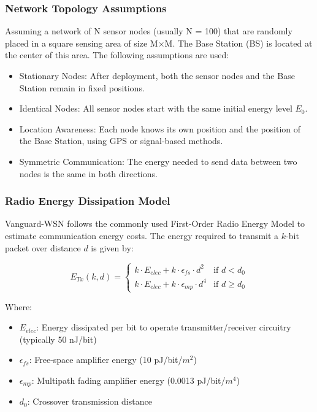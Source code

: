 \documentclass[conference]{IEEEtran}
\begin{document}
\subsubsection{Network Topology Assumptions}
Assuming a network of N sensor nodes (usually N = 100) that are randomly placed in a square sensing area of size M$\times$M. The Base Station (BS) is located at the center of this area.
The following assumptions are used:
\begin{itemize}
    \item Stationary Nodes: After deployment, both the sensor nodes and the Base Station remain in fixed positions.
    \item Identical Nodes: All sensor nodes start with the same initial energy level $E_0$.
    \item Location Awareness: Each node knows its own position and the position of the Base Station, using GPS or signal-based methods.
    \item Symmetric Communication: The energy needed to send data between two nodes is the same in both directions.
\end{itemize}

\subsubsection{Radio Energy Dissipation Model}
Vanguard-WSN follows the commonly used First-Order Radio Energy Model to estimate communication energy costs. The energy required to transmit a $k$-bit packet over distance $d$ is given by:

\begin{equation}
E_{Tx}(k, d) = \begin{cases} 
k \cdot E_{elec} + k \cdot \epsilon_{fs} \cdot d^2 & \text{if } d < d_0 \\
k \cdot E_{elec} + k \cdot \epsilon_{mp} \cdot d^4 & \text{if } d \ge d_0 
\end{cases}
\end{equation}

Where:
\begin{itemize}
    \item $E_{elec}$: Energy dissipated per bit to operate transmitter/receiver circuitry (typically 50 nJ/bit)
    \item $\epsilon_{fs}$: Free-space amplifier energy (10 pJ/bit/$m^2$)
    \item $\epsilon_{mp}$: Multipath fading amplifier energy (0.0013 pJ/bit/$m^4$)
    \item $d_0$: Crossover transmission distance 
\end{itemize}
\end{document}
